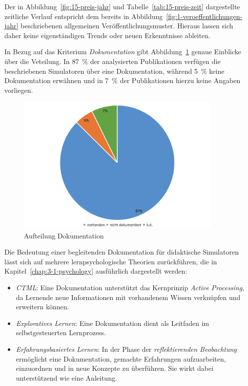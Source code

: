 Der in Abbildung~\ref{fig:15-preis-jahr} und Tabelle~\ref{tab:15-preis-zeit} dargestellte zeitliche Verlauf entspricht dem bereits in Abbildung~\ref{fig:1-veroeffentlichungen-jahr} beschriebenen allgemeinen Veröffentlichungsmuster. Hieraus lassen sich daher keine eigenständigen Trends oder neuen Erkenntnisse ableiten.

In Bezug auf das Kriterium \textit{Dokumentation} gibt Abbildung~\ref{fig:16-dokumentation} genaue Einblicke über die Veteilung. In 87~\% der analysierten Publikationen verfügen die beschriebenen Simulatoren über eine Dokumentation, während 5~\% keine Dokumentation erwähnen und in 7~\% der Publikationen hierzu keine Angaben vorliegen.

\begin{figure}[!htbp]
    \centering
    \includegraphics[width=0.90\textwidth]{graphics_lit/16-dokumentation.png}
    \caption{Aufteilung Dokumentation}
    \label{fig:16-dokumentation}
\end{figure}

Die Bedeutung einer begleitenden Dokumentation für didaktische Simulatoren lässt sich auf mehrere lernpsychologische Theorien zurückführen, die in Kapitel~\ref{chap:3-1-psychology} ausführlich dargestellt werden:

\begin{itemize}
    \item \textit{\ac{CTML}}: Eine Dokumentation unterstützt das Kernprinzip \textit{Active Processing}, da Lernende neue Informationen mit vorhandenem Wissen verknüpfen und erweitern können.
    \item \textit{Exploratives Lernen}: Eine Dokumentation dient als Leitfaden im selbstgesteuerten Lernprozess.
    \item \textit{Erfahrungsbasiertes Lernen}: In der Phase der \textit{reflektierenden Beobachtung} ermöglicht eine Dokumentation, gemachte Erfahrungen aufzuarbeiten, einzuordnen und in neue Konzepte zu überführen. Sie wirkt dabei unterstützend wie eine Anleitung.
\end{itemize}

